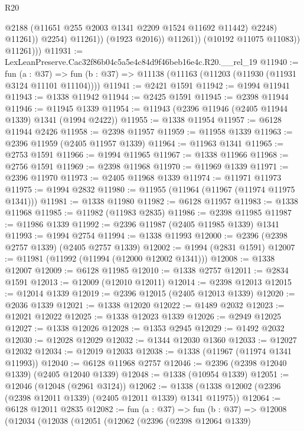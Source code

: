 \begin{lexlean}{R20}
\begin{coremodule}
                              @2188
                              (@11651 @255 @2003 @1341 @2209 @1524 @11692 @11442)
                              @2248)
                            @11261))
                        @2254)
                      @11261))
                  (@1923 @2016))
                @11261))
            (@10192 @11075 @11083))
          @11261)))
@11931 := LexLeanPreserve.Cac32f86b04c5a5e4c84d9f46beb16e4c.R20.__rel_19
@11940 := fun (a : @37) =>
  fun (b : @37) => @11138 (@11163 (@11203 (@11930 (@11931 @3124 @11101 @11104))))
@11941 := @2421 @1591
@11942 := @1994 @11941
@11943 := @1338 @11942
@11944 := @2425 @1591
@11945 := @2398 @11944
@11946 := @11945 @1339
@11954 := @11943 (@2396 @11946 (@2405 @11944 @1339) @1341 (@1994 @2422))
@11955 := @1338 @11954
@11957 := @6128 @11944 @2426
@11958 := @2398 @11957
@11959 := @11958 @1339
@11963 := @2396 @11959 (@2405 @11957 @1339)
@11964 := @11963 @1341
@11965 := @2753 @1591
@11966 := @1994 @11965
@11967 := @1338 @11966
@11968 := @2756 @1591
@11969 := @2398 @11968
@11970 := @11969 @1339
@11971 := @2396 @11970
@11973 := @2405 @11968 @1339
@11974 := @11971 @11973
@11975 := @1994 @2832
@11980 := @11955 (@11964 (@11967 (@11974 @11975 @1341)))
@11981 := @1338 @11980
@11982 := @6128 @11957
@11983 := @1338 @11968
@11985 := @11982 (@11983 @2835)
@11986 := @2398 @11985
@11987 := @11986 @1339
@11992 := @2396 @11987 (@2405 @11985 @1339) @1341
@11993 := @1994 @2754
@11994 := @1338 @11993
@12000 := @2396 (@2398 @2757 @1339) (@2405 @2757 @1339)
@12002 := @1994 (@2831 @1591)
@12007 := @11981 (@11992 (@11994 (@12000 @12002 @1341)))
@12008 := @1338 @12007
@12009 := @6128 @11985
@12010 := @1338 @2757
@12011 := @2834 @1591
@12013 := @12009 (@12010 @12011)
@12014 := @2398 @12013
@12015 := @12014 @1339
@12019 := @2396 @12015 (@2405 @12013 @1339)
@12020 := @2036 @1339
@12021 := @1338 @12020
@12022 := @1489 @2032
@12023 := @12021 @12022
@12025 := @1338 @12023 @1339
@12026 := @2949 @12025
@12027 := @1338 @12026
@12028 := @1353 @2945
@12029 := @1492 @2032
@12030 := @12028 @12029
@12032 := @1344 @12030 @1360
@12033 := @12027 @12032
@12034 := @12019 @12033
@12038 := @1338 (@11967 (@11974 @1341 @11993))
@12040 := @6128 @11968 @2757
@12046 := @2396 (@2398 @12040 @1339) (@2405 @12040 @1339)
@12048 := @1338 (@10954 @1339)
@12051 := @12046 (@12048 (@2961 @3124))
@12062 := @1338 (@1338 @12002 (@2396 (@2398 @12011 @1339) (@2405 @12011 @1339) @1341 @11975))
@12064 := @6128 @12011 @2835
@12082 := fun (a : @37) =>
  fun (b : @37) =>
  @12008
    (@12034
      (@12038
        (@12051
          (@12062
            (@2396
              (@2398 @12064 @1339)

\end{coremodule}
\end{lexlean}
